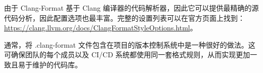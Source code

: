 
由于 Clang-Format 基于 Clang 编译器的代码解析器，因此它可以提供最精确的源代码分析，因此配置选项也最丰富。完整的设置列表可以在官方页面上找到： \url{https://clang.llvm.org/docs/ClangFormatStyleOptions.html}。


通常，将 .clang-format 文件包含在项目的版本控制系统中是一种很好的做法。这可确保团队的每个成员以及 CI/CD 系统都使用同一套格式规则，从而实现更加一致且易于维护的代码库。
























